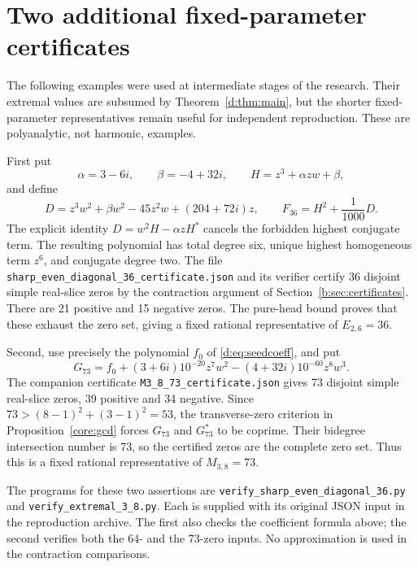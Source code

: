 \documentclass[UTF8,11pt]{ctexart}
\theoremstyle{definition}
\numberwithin{equation}{section}
\begin{document}
\section{Two additional fixed-parameter certificates}\label{app:otherfixed}
The following examples were used at intermediate stages of the research.
Their extremal values are subsumed by Theorem~\ref{d:thm:main}, but the
shorter fixed-parameter representatives remain useful for independent
reproduction. These are polyanalytic, not harmonic, examples.

First put
\[
 \alpha=3-6i,\qquad \beta=-4+32i,\qquad
 H=z^3+\alpha zw+\beta,
\]
and define
\[
 D=z^3w^2+\beta w^2-45z^2w+(204+72i)z,\qquad
 F_{36}=H^2+\frac1{1000}D.
\]
The explicit identity $D=w^2H-\alpha zH^*$ cancels the forbidden
highest conjugate term. The resulting polynomial has total degree six,
unique highest homogeneous term $z^6$, and conjugate degree two.
The file \nolinkurl{sharp_even_diagonal_36_certificate.json} and its
verifier certify 36 disjoint simple real-slice zeros by the contraction
argument of Section~\ref{b:sec:certificates}. There are 21 positive and
15 negative zeros. The pure-head bound proves that these exhaust the
zero set, giving a fixed rational representative of $E_{2,6}=36$.

Second, use precisely the polynomial $f_0$ of
\eqref{d:eq:seedcoeff}, and put
\[
 G_{73}=f_0+(3+6i)10^{-20}z^7w^2-(4+32i)10^{-60}z^8w^3.
\]
The companion certificate \nolinkurl{M3_8_73_certificate.json} gives
73 disjoint simple real-slice zeros, 39 positive and 34 negative.
Since $73>(8-1)^2+(3-1)^2=53$, the transverse-zero criterion in
Proposition~\ref{core:gcd} forces $G_{73}$ and $G_{73}^*$ to
be coprime. Their bidegree intersection number is 73, so the certified
zeros are the complete zero set. Thus this is a fixed rational
representative of $M_{3,8}=73$.

The programs for these two assertions are
\nolinkurl{verify_sharp_even_diagonal_36.py} and
\nolinkurl{verify_extremal_3_8.py}. Each is supplied with its original
JSON input in the reproduction archive. The first also checks the
coefficient formula above; the second verifies both the 64- and the
73-zero inputs. No approximation is used in the contraction comparisons.
\end{document}
